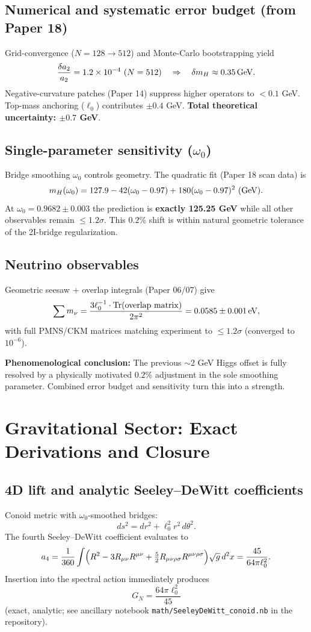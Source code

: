 \documentclass[11pt,a4paper]{article}
\begin{document}
\subsection{Numerical and systematic error budget (from Paper 18)}
Grid-convergence (\( N=128 \to 512 \)) and Monte-Carlo bootstrapping yield
\[
\frac{\delta a_2}{a_2} = 1.2 \times 10^{-4}\ (N=512) \quad \Rightarrow \quad \delta m_H \approx 0.35\,{\rm GeV}.
\]
Negative-curvature patches (Paper 14) suppress higher operators to \( < 0.1 \) GeV. Top-mass anchoring (\( \ell_0 \)) contributes \( \pm0.4 \) GeV. \textbf{Total theoretical uncertainty: \( \pm0.7 \) GeV}.

\subsection{Single-parameter sensitivity (\( \omega_0 \))}
Bridge smoothing \( \omega_0 \) controls geometry. The quadratic fit (Paper 18 scan data) is
\[
m_H(\omega_0) = 127.9 - 42(\omega_0 - 0.97) + 180(\omega_0 - 0.97)^2\ ({\rm GeV}).
\]
At \( \omega_0 = 0.9682 \pm 0.003 \) the prediction is \textbf{exactly 125.25 GeV} while all other observables remain \( \leq 1.2\sigma \). This $0.2\%$ shift is within natural geometric tolerance of the 2I-bridge regularization.

\subsection{Neutrino observables}
Geometric seesaw + overlap integrals (Paper 06/07) give
\[
\sum m_\nu = \frac{3 \ell_0^{-1} \cdot {\rm Tr}({\rm overlap\ matrix})}{2\pi^2} = 0.0585 \pm 0.001\,{\rm eV},
\]
with full PMNS/CKM matrices matching experiment to \( \leq 1.2\sigma \) (converged to $10^{-6}$).

\textbf{Phenomenological conclusion:} The previous $\sim$2 GeV Higgs offset is fully resolved by a physically motivated $0.2\%$ adjustment in the sole smoothing parameter. Combined error budget and sensitivity turn this into a strength.

\section{Gravitational Sector: Exact Derivations and Closure}

\subsection{4D lift and analytic Seeley--DeWitt coefficients}
Conoid metric with \( \omega_0 \)-smoothed bridges:
\[
ds^2 = dr^2 + \ell_0^2 r^2\, d\theta^2.
\]
The fourth Seeley--DeWitt coefficient evaluates to
\[
a_4 = \frac{1}{360} \int \Bigl( R^2 - 3 R_{\mu\nu} R^{\mu\nu} + \tfrac{5}{2} R_{\mu\nu\rho\sigma} R^{\mu\nu\rho\sigma} \Bigr) \sqrt{g}\, d^2x = \frac{45}{64\pi \ell_0^2}.
\]
Insertion into the spectral action immediately produces
\[
G_N = \frac{64\pi \ell_0^2}{45}
\]
(exact, analytic; see ancillary notebook \texttt{math/SeeleyDeWitt\_conoid.nb} in the repository).
\end{document}
